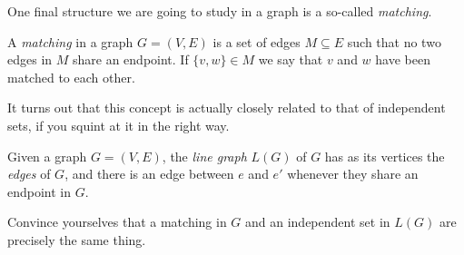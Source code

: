 \documentclass[nobib]{tufte-handout}
\begin{document}
One final structure we are going to study in a graph is a so-called \emph{matching}.

\begin{definition}
  A \emph{matching} in a graph $G = (V,E)$ is a set of edges $M \subseteq E$ such that no two edges in $M$ share an endpoint. If $\{v, w\} \in M$ we say that $v$ and $w$ have been matched to each other.
\end{definition}

It turns out that this concept is actually closely related to that of independent sets, if you squint at it in the right way.

\begin{definition}
  Given a graph $G = (V, E)$, the \emph{line graph} $L(G)$ of $G$ has as its vertices the \emph{edges} of $G$, and there is an edge between $e$ and $e'$ whenever they share an endpoint in $G$.
\end{definition}

\begin{xca}
  Convince yourselves that a matching in $G$ and an independent set in $L(G)$ are precisely the same thing.
\end{xca}

%
%
\end{document}
